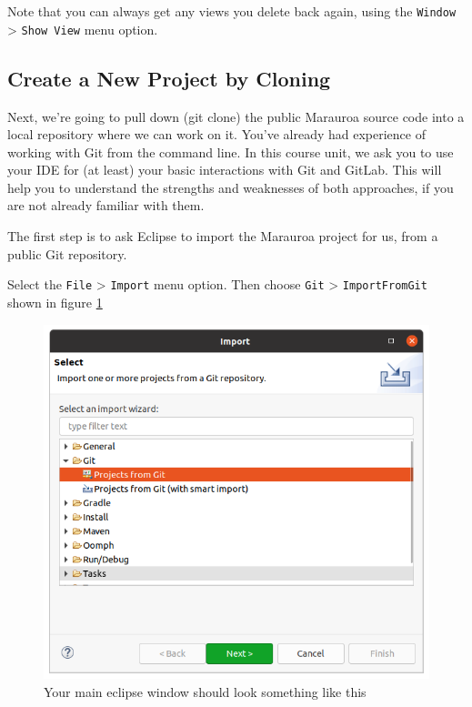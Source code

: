 \documentclass[
]{book}
\begin{document}
Note that you can always get any views you delete back again, using the \texttt{Window} \textgreater{} \texttt{Show\ View} menu option.

\hypertarget{newproj}{%
\subsection{Create a New Project by Cloning}\label{newproj}}

Next, we're going to pull down (git clone) the public Marauroa source code into a local repository where we can work on it. You've already had experience of working with Git from the command line. In this course unit, we ask you to use your IDE for (at least) your basic interactions with Git and GitLab. This will help you to understand the strengths and weaknesses of both approaches, if you are not already familiar with them.

The first step is to ask Eclipse to import the Marauroa project for us, from a public Git repository.

Select the \texttt{File} \textgreater{} \texttt{Import} menu option. Then choose \texttt{Git} \textgreater{} \texttt{ImportFromGit} shown in figure \ref{fig:eclipseImportProjectFromGit-fig}

\begin{figure}

{\centering \includegraphics[width=1\linewidth]{images/1.4.eclipseImportProjectFromGit} 

}

\caption{Your main eclipse window should look something like this}\label{fig:eclipseImportProjectFromGit-fig}
\end{figure}
\end{document}
